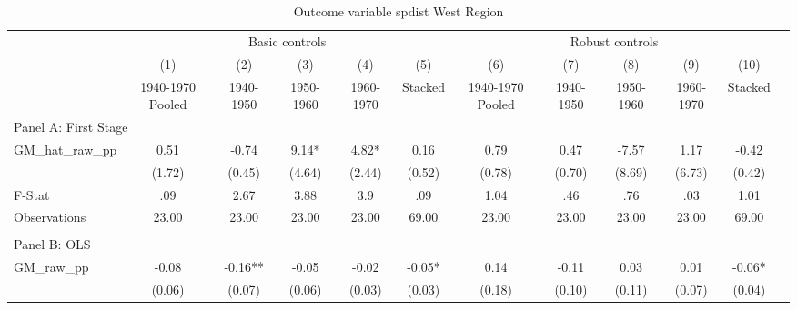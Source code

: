  \begin{table}[htbp]\centering {} \begin{threeparttable} \caption{Outcome variable spdist West Region} \begin{tabular}{l*{11}{c}} \toprule
          &\multicolumn{5}{c}{Basic controls}                                   &\multicolumn{5}{c}{Robust controls}                                  \\\cmidrule(lr){2-6}\cmidrule(lr){7-11}
          &\multicolumn{1}{c}{(1)}&\multicolumn{1}{c}{(2)}&\multicolumn{1}{c}{(3)}&\multicolumn{1}{c}{(4)}&\multicolumn{1}{c}{(5)}&\multicolumn{1}{c}{(6)}&\multicolumn{1}{c}{(7)}&\multicolumn{1}{c}{(8)}&\multicolumn{1}{c}{(9)}&\multicolumn{1}{c}{(10)}\\
          &\multicolumn{1}{c}{1940-1970 Pooled}&\multicolumn{1}{c}{1940-1950}&\multicolumn{1}{c}{1950-1960}&\multicolumn{1}{c}{1960-1970}&\multicolumn{1}{c}{Stacked}&\multicolumn{1}{c}{1940-1970 Pooled}&\multicolumn{1}{c}{1940-1950}&\multicolumn{1}{c}{1950-1960}&\multicolumn{1}{c}{1960-1970}&\multicolumn{1}{c}{Stacked}\\
\cmidrule(lr){1-11}
\multicolumn{10}{l}{Panel A: First Stage}\\
\cmidrule(lr){1-11}
GM\_hat\_raw\_pp&      0.51   &     -0.74   &      9.14*  &      4.82*  &      0.16   &      0.79   &      0.47   &     -7.57   &      1.17   &     -0.42   \\
          &    (1.72)   &    (0.45)   &    (4.64)   &    (2.44)   &    (0.52)   &    (0.78)   &    (0.70)   &    (8.69)   &    (6.73)   &    (0.42)   \\
\midrule
F-Stat    &       .09   &      2.67   &      3.88   &       3.9   &       .09   &      1.04   &       .46   &       .76   &       .03   &      1.01   \\
Observations&     23.00   &     23.00   &     23.00   &     23.00   &     69.00   &     23.00   &     23.00   &     23.00   &     23.00   &     69.00   \\
\cmidrule[\heavyrulewidth](lr){1-11} \\ \cmidrule[\heavyrulewidth](lr){1-11}
\multicolumn{10}{l}{Panel B: OLS}\\
\cmidrule(lr){1-11}
GM\_raw\_pp &     -0.08   &     -0.16** &     -0.05   &     -0.02   &     -0.05*  &      0.14   &     -0.11   &      0.03   &      0.01   &     -0.06*  \\
          &    (0.06)   &    (0.07)   &    (0.06)   &    (0.03)   &    (0.03)   &    (0.18)   &    (0.10)   &    (0.11)   &    (0.07)   &    (0.04)   \\

\end{tabular}
\end{threeparttable}
\end{table}
